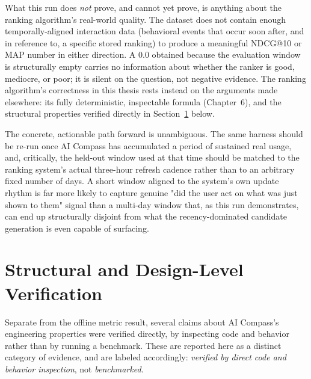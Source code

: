 What this run does \emph{not} prove, and cannot yet prove, is anything about the ranking algorithm's real-world quality. The dataset does not contain enough temporally-aligned interaction data (behavioral events that occur soon after, and in reference to, a specific stored ranking) to produce a meaningful NDCG@10 or MAP number in either direction. A $0.0$ obtained because the evaluation window is structurally empty carries no information about whether the ranker is good, mediocre, or poor; it is silent on the question, not negative evidence. The ranking algorithm's correctness in this thesis rests instead on the arguments made elsewhere: its fully deterministic, inspectable formula (Chapter~6), and the structural properties verified directly in Section~\ref{sec:eval-structural} below.

The concrete, actionable path forward is unambiguous. The same harness should be re-run once AI Compass has accumulated a period of sustained real usage, and, critically, the held-out window used at that time should be matched to the ranking system's actual three-hour refresh cadence rather than to an arbitrary fixed number of days. A short window aligned to the system's own update rhythm is far more likely to capture genuine "did the user act on what was just shown to them" signal than a multi-day window that, as this run demonstrates, can end up structurally disjoint from what the recency-dominated candidate generation is even capable of surfacing.

\section{Structural and Design-Level Verification}
\label{sec:eval-structural}

Separate from the offline metric result, several claims about AI Compass's engineering properties were verified directly, by inspecting code and behavior rather than by running a benchmark. These are reported here as a distinct category of evidence, and are labeled accordingly: \emph{verified by direct code and behavior inspection}, not \emph{benchmarked}.

